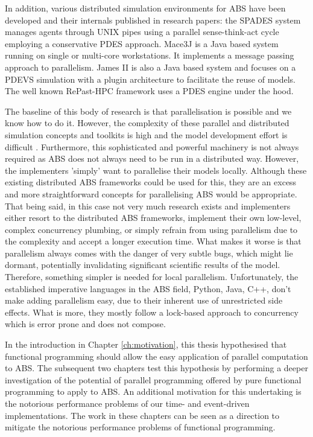 In addition, various distributed simulation environments for ABS have been developed and their internals published in research papers: the SPADES system \cite{riley_next_2003} manages agents through UNIX pipes using a parallel sense-think-act cycle employing a conservative PDES approach. Mace3J \cite{gasser_mace3j:_2002} is a Java based system running on single or multi-core workstations. It implements a message passing approach to parallelism. James II \cite{himmelspach_plugn_2007} is also a Java based system and focuses on a PDEVS simulation with a plugin architecture to facilitate the reuse of models. The well known RePast-HPC \cite{gorur_repast_2016, minson_distributing_2008} framework uses a PDES engine under the hood. 

The baseline of this body of research is that parallelisation is possible and we know how to do it. However, the complexity of these parallel and distributed simulation concepts and toolkits is high and the model development effort is difficult \cite{abar_agent_2017}. Furthermore, this sophisticated and powerful machinery is not always required as ABS does not always need to be run in a distributed way. However, the implementers 'simply' want to parallelise their models locally. Although these existing distributed ABS frameworks could be used for this, they are an excess and more straightforward concepts for parallelising ABS would be appropriate. That being said, in this case not very much research exists and implementers either resort to the distributed ABS frameworks, implement their own low-level, complex concurrency plumbing, or simply refrain from using parallelism due to the complexity and accept a longer execution time. What makes it worse is that parallelism always comes with the danger of very subtle bugs, which might lie dormant, potentially invalidating significant scientific results of the model. Therefore, something simpler is needed for local parallelism. Unfortunately, the established imperative languages in the ABS field, Python, Java, C++, don't make adding parallelism easy, due to their inherent use of unrestricted side effects. What is more, they mostly follow a lock-based approach to concurrency which is error prone and does not compose.

\medskip

In the introduction in Chapter \ref{ch:motivation}, this thesis hypothesised that functional programming should allow the easy application of parallel computation to ABS. The subsequent two chapters test this hypothesis by performing a deeper investigation of the potential of parallel programming offered by pure functional programming to apply to ABS. An additional motivation for this undertaking is the notorious performance problems of our time- and event-driven implementations. The work in these chapters can be seen as a direction to mitigate the notorious performance problems of functional programming.

